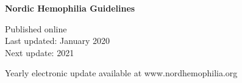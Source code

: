 
\begin{centering}

\vspace{3 cm}

\Huge

{\bf Nordic Hemophilia Guidelines}

\vspace{3 cm}


\normalsize

Published online\\
Last updated: January 2020\\
Next update: 2021

\vspace{1 cm}

Yearly electronic update available at www.nordhemophilia.org

\end{centering}

\thispagestyle{empty}